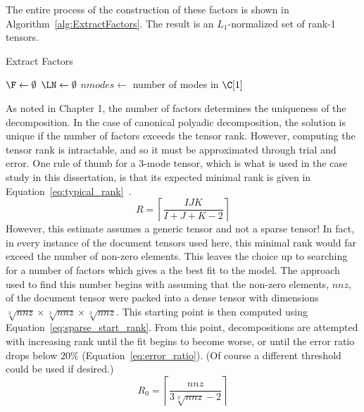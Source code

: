 \documentclass[../ut-dissertation.tex]{subfiles}
\begin{document}
The entire process of the construction of these factors is shown in
Algorithm~\ref{alg:ExtractFactors}.  The result is an $L_1$-normalized
set of rank-1 tensors.  
\begin{algorithm}
  \caption{Extract Factors}
  \label{alg:ExtractFactors}
    
   
  \Output{\LN, \F}
  \BlankLine
  $\F \leftarrow \emptyset$\;
  $\LN \leftarrow \emptyset$\;
  $nmodes \leftarrow$ number of modes in $\C[1]$\;
  \Return{\LN, \F}
\end{algorithm}

As noted in Chapter 1, the number of factors determines the uniqueness
of the decomposition.  In the case of canonical polyadic
decomposition, the solution is unique if the number of factors exceeds
the tensor rank.  However, computing the tensor rank is intractable,
and so it must be approximated through trial and error.  One rule of
thumb for a 3-mode tensor, which is what is used in the case study in
this dissertation, is that its expected minimal rank is given in
Equation~\ref{eq:typical_rank}~\cite{comon2009}.
\begin{equation} \label{eq:typical_rank}
  R = \left\lceil \displaystyle\frac{IJK}{I+J+K-2} \right\rceil
\end{equation}
However, this estimate assumes a generic tensor and not a sparse
tensor!  In fact, in every instance of the document tensors used here,
this minimal rank would far exceed the number of non-zero elements.
This leaves the choice up to searching for a number of factors which
gives a the best fit to the model.  The approach used to find this
number begins with assuming that the non-zero elements, $nnz$, of the
document tensor were packed into a dense tensor with dimensions
$\sqrt[3]{nnz} \times \sqrt[3]{nnz} \times \sqrt[3]{nnz}$.  This
starting point is then computed using
Equation~\ref{eq:sparse_start_rank}.  From this point, decompositions
are attempted with increasing rank until the fit begins to become
worse, or until the error ratio drops below $20\%$
(Equation~\ref{eq:error_ratio}).  (Of course a different threshold
could be used if desired.)
\begin{equation}\label{eq:sparse_start_rank}
  R_0 = \left\lceil \displaystyle\frac{nnz}{3\sqrt[3]{nnz}-2} \right\rceil
  \end{equation}
  
\end{document}
